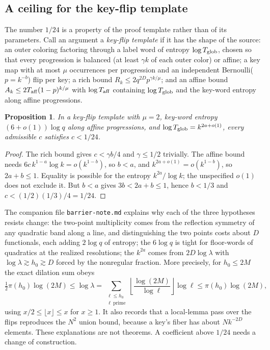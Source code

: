 \documentclass[11pt]{article}
\newtheorem{proposition}{Proposition}
\begin{document}
\subsection{A ceiling for the key-flip template}
The number $1/24$ is a property of the proof template rather than of
its parameters. Call an argument a \emph{key-flip template} if it has
the shape of the source: an outer coloring factoring through a label
word of entropy $\log T_{\rm glob}$, chosen so that every progression is
balanced (at least $\gamma k$ of each outer color) or affine; a key map
with at most $\mu$ occurrences per progression and an independent
Bernoulli($p=k^{-b}$) flip per key; a rich bound
$R_k\le2q^{2D}p^{\gamma k/\mu}$; and an affine bound
$A_k\le2T_{\rm aff}(1-p)^{k/\mu}$ with $\log T_{\rm aff}$ containing
$\log T_{\rm glob}$ and the key-word entropy along affine progressions.
\begin{proposition}\label{prop:ceiling}
In a key-flip template with $\mu=2$, key-word entropy
$(6+o(1))\log q$ along affine progressions, and
$\log T_{\rm glob}=k^{2a+o(1)}$, every admissible $c$ satisfies
$c<1/24$.
\end{proposition}
\begin{proof}
The rich bound gives $c<\gamma b/4$ and $\gamma\le1/2$ trivially. The
affine bound needs $6c\,k^{1-a}\log k=o(k^{1-b})$, so $b<a$, and
$k^{2a+o(1)}=o(k^{1-b})$, so $2a+b\le1$. Equality is possible for
the entropy $k^{2a}/\log k$; the unspecified $o(1)$ does not exclude it.
But $b<a$ gives $3b<2a+b\le1$, hence $b<1/3$ and
$c<(1/2)(1/3)/4=1/24$.
\end{proof}
The companion file \texttt{barrier-note.md} explains why each of the
three hypotheses resists change: the two-point multiplicity comes from
the reflection symmetry of any quadratic band along a line, and
distinguishing the two points costs about $D$ functionals, each adding
$2\log q$ of entropy; the $6\log q$ is tight for floor-words of
quadratics at the realized resolutions; the $k^{2a}$ comes from
$2D\log\lambda$ with $\log\lambda\gtrsim h_0\gtrsim D$ forced by the
nonregular fraction. More precisely, for $h_0\le2M$ the exact dilation
sum obeys
\[
 \tfrac12\pi(h_0)\log(2M)
 \le\log\lambda
 =\sum_{\substack{\ell\le h_0\\\ell\ \mathrm{prime}}}
   \left\lfloor\frac{\log(2M)}{\log\ell}\right\rfloor\log\ell
 \le\pi(h_0)\log(2M),
\]
using $x/2\le\lfloor x\rfloor\le x$ for $x\ge1$.
It also records that a local-lemma pass over the
flips reproduces the $N^2$ union bound, because a key's fiber has about
$Nk^{-2D}$ elements. These explanations are not theorems. A coefficient
above $1/24$ needs a change of construction.
\end{document}
